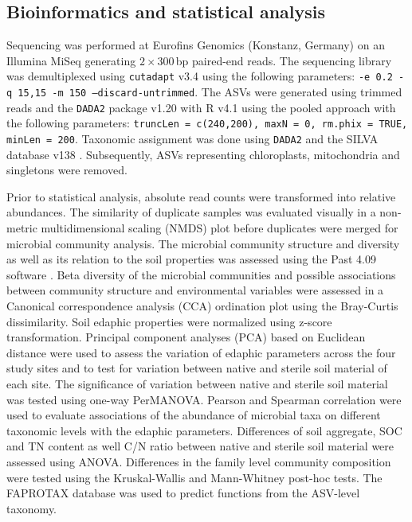 \subsection{Bioinformatics and statistical analysis}

Sequencing was performed at Eurofins Genomics (Konstanz, Germany) on an Illumina MiSeq generating \(2\times 300\)\,bp paired-end reads. The sequencing library was demultiplexed using \texttt{cutadapt} v3.4 \citep{Martin2011} using the following parameters: \texttt{-e 0.2 -q 15,15 -m 150 --discard-untrimmed}. The ASVs were generated using trimmed reads and the \texttt{DADA2} package v1.20 \citep{Callahan2016} with R v4.1 using the pooled approach with the following parameters: \texttt{truncLen = c(240,200), maxN = 0, rm.phix = TRUE, minLen = 200}. Taxonomic assignment was done using \texttt{DADA2} and the SILVA database v138 \citep{Quast2012}. 
Subsequently, ASVs representing chloroplasts, mitochondria and singletons were removed.

Prior to statistical analysis, absolute read counts were transformed into relative abundances. The similarity of duplicate samples was evaluated visually in a non-metric multidimensional scaling (NMDS) plot before duplicates were merged for microbial community analysis. The microbial community structure and diversity as well as its relation to the soil properties was assessed using the Past 4.09 software \citep{Hammer2001}. Beta diversity of the microbial communities and possible associations between community structure and environmental variables were assessed in a Canonical correspondence analysis (CCA) ordination plot using the Bray-Curtis dissimilarity. Soil edaphic properties were normalized using z-score transformation. Principal component analyses (PCA) based on Euclidean distance were used to assess the variation of edaphic parameters across the four study sites and to test for variation between native and sterile soil material of each site. The significance of variation between native and sterile soil material was tested using one-way PerMANOVA. Pearson and Spearman correlation were used to evaluate associations of the abundance of microbial taxa on different taxonomic levels with the edaphic parameters. Differences of soil aggregate, SOC and TN content as well C/N ratio between native and sterile soil material were assessed using ANOVA. Differences in the family level community composition were tested using the Kruskal-Wallis and Mann-Whitney post-hoc tests. 
The FAPROTAX database \citep{Louca2016} was used to predict functions from the ASV-level taxonomy.

